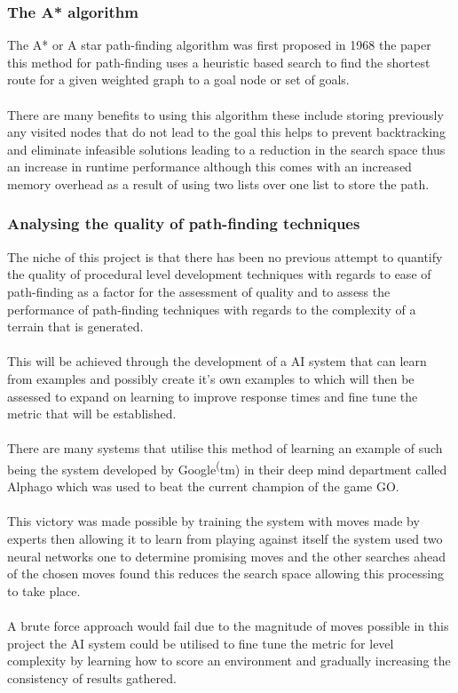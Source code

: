 \subsubsection{The A* algorithm}
The A* or A star path-finding algorithm was first proposed in 1968 the paper \cite{A*} this method for path-finding uses a heuristic based search to find the shortest route for a given weighted graph to a goal node or set of goals.\\\\ There are many benefits to using this algorithm these include storing previously any visited nodes that do not lead to the goal this helps to prevent backtracking and eliminate infeasible solutions leading to a reduction in the search space thus an increase in runtime performance although this comes with an increased memory overhead as a result of using two lists over one list to store the path.   
\subsubsection{Analysing the quality of path-finding techniques}
\label{quality}
The niche of this project is that there has been no previous attempt to quantify the quality of procedural level development techniques with regards to ease of path-finding as a factor for the assessment of quality and  to assess the performance of path-finding techniques with regards to the complexity of a terrain that is generated.\\\\ This will be achieved through the development of a AI system that can learn from examples and possibly create it's own examples to which will then be assessed to expand on learning to improve response times and fine tune the metric that will be established.\\\\ There are many systems that utilise this method of learning an example of such being the system developed by Google\textsuperscript(tm) in their deep mind department called Alphago which was used to beat the current champion of the game GO\cite{AI-learning}.\\\\ This victory was made possible by training the system with moves made by experts then allowing it to learn from playing against itself the system used two neural networks one to determine promising moves and the other searches ahead of the chosen moves found this reduces the search space allowing this processing to take place.\\\\ A brute force approach would fail due to the magnitude of moves possible in this project the AI system could be utilised to fine tune the metric for level complexity by learning how to score an environment and gradually increasing the consistency of results gathered.

